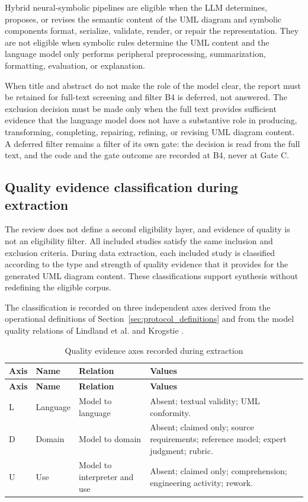 Hybrid neural-symbolic pipelines are eligible when the LLM determines, proposes, or revises the semantic content of the UML diagram and symbolic components format, serialize, validate, render, or repair the representation. They are not eligible when symbolic rules determine the UML content and the language model only performs peripheral preprocessing, summarization, formatting, evaluation, or explanation.

When title and abstract do not make the role of the model clear, the report must be retained for full-text screening and filter B4 is deferred, not answered. The exclusion decision must be made only when the full text provides sufficient evidence that the language model does not have a substantive role in producing, transforming, completing, repairing, refining, or revising UML diagram content. A deferred filter remains a filter of its own gate: the decision is read from the full text, and the code and the gate outcome are recorded at B4, never at Gate C.

\subsection{Quality evidence classification during extraction}
\label{sec:protocol_quality_axes}

The review does not define a second eligibility layer, and evidence of quality is not an eligibility filter. All included studies satisfy the same inclusion and exclusion criteria. During data extraction, each included study is classified according to the type and strength of quality evidence that it provides for the generated UML diagram content. These classifications support synthesis without redefining the eligible corpus.

The classification is recorded on three independent axes derived from the operational definitions of Section~\ref{sec:protocol_definitions} and from the model quality relations of Lindland et al. and Krogstie \cite{Lindland1994Quality,Krogstie2006Process}.

\begin{longtable}{p{} p{} p{} p{}}
\caption{Quality evidence axes recorded during extraction}
\label{tab:protocol_quality_axes}\\
\toprule
\textbf{Axis} & \textbf{Name} & \textbf{Relation} & \textbf{Values} \\
\midrule
\endfirsthead
\toprule
\textbf{Axis} & \textbf{Name} & \textbf{Relation} & \textbf{Values} \\
\midrule
\endhead
L & Language & Model to language & Absent; textual validity; UML conformity. \\
D & Domain & Model to domain & Absent; claimed only; source requirements; reference model; expert judgment; rubric. \\
U & Use & Model to interpreter and use & Absent; claimed only; comprehension; engineering activity; rework. \\
\bottomrule
\end{longtable}

